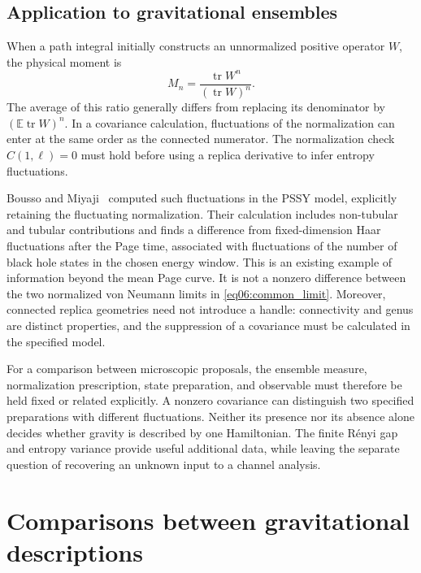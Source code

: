 \documentclass[11pt,letterpaper]{article}
\theoremstyle{plain}
\theoremstyle{definition}
\theoremstyle{remark}
\newcommand{\E}{\mathbb{E}}
\DeclareMathOperator{\tr}{tr}
\begin{document}
\subsection{Application to gravitational ensembles}
\label{subsec06:interpretation}

When a path integral initially constructs an unnormalized positive
operator $W$, the physical moment is
\begin{equation}
 M_n=\frac{\tr W^n}{(\tr W)^n}.
 \label{eq06:normalized_ratio}
\end{equation}
The average of this ratio generally differs from replacing its
denominator by $(\E\tr W)^n$.  In a covariance calculation, fluctuations
of the normalization can enter at the same order as the connected
numerator.  The normalization check $C(1,\ell)=0$ must hold before
using a replica derivative to infer entropy fluctuations.

Bousso and Miyaji~\citep{boussomiyaji2024} computed such fluctuations
in the PSSY model, explicitly retaining the fluctuating normalization.
Their calculation includes non-tubular and tubular contributions and
finds a difference from fixed-dimension Haar fluctuations after the
Page time, associated with fluctuations of the number of black hole
states in the chosen energy window.  This is an existing example of
information beyond the mean Page curve.  It is not a nonzero difference
between the two normalized von Neumann limits in
\eqref{eq06:common_limit}.  Moreover, connected replica geometries
need not introduce a handle: connectivity and genus are distinct
properties, and the suppression of a covariance must be calculated
in the specified model.

For a comparison between microscopic proposals, the ensemble measure,
normalization prescription, state preparation, and observable must
therefore be held fixed or related explicitly.  A nonzero covariance
can distinguish two specified preparations with different fluctuations.
Neither its presence nor its absence alone decides whether gravity is
described by one Hamiltonian.  The finite R\'enyi gap and entropy variance
provide useful additional data, while leaving the separate question of
recovering an unknown input to a channel analysis.

\section{Comparisons between gravitational descriptions}
\label{sec07:discriminating}
\end{document}

